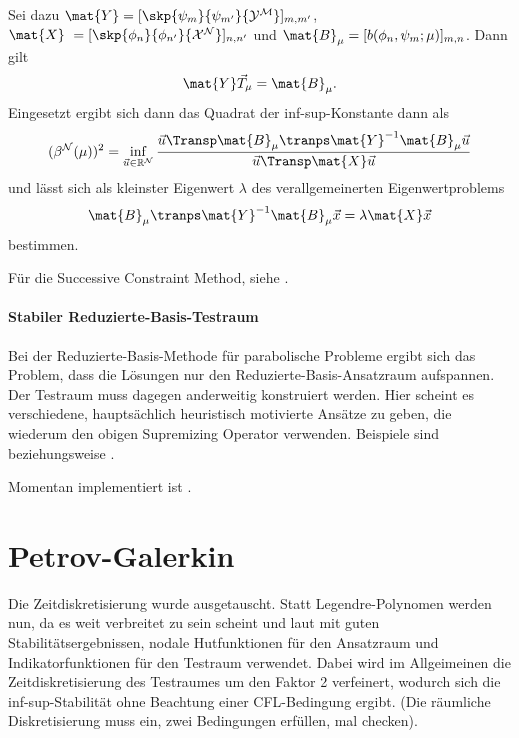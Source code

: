 Sei dazu $\mat{Y} = [\skp{\psi_{m}}{\psi_{m'}}{\mathcal Y^{\mathcal M}}]_{m, m'}$, $\mat{X} = [\skp{\phi_{n}}{\phi_{n'}}{\mathcal X^{\mathcal N}}]_{n, n'}$ und $\mat{B}_{\mu} = [b(\phi_{n}, \psi_{m}; \mu)]_{m, n}$.
Dann gilt
\begin{equation}
    \mat{Y} \vec{T}_{\mu} = \mat{B}_{\mu}.
\end{equation}
Eingesetzt ergibt sich dann das Quadrat der inf-sup-Konstante dann als
\begin{equation}
    (\beta^{\mathcal N}(\mu))^{2} = \inf_{\vec{u} \in \mathbb{R}^{\mathcal N}} \frac{\vec{u}\Transp \mat{B}_{\mu}\tranps \mat{Y}^{-1} \mat{B}_{\mu} \vec{u}}{\vec{u}\Transp \mat{X} \vec{u}}
\end{equation}
und lässt sich als kleinster Eigenwert $\lambda$ des verallgemeinerten Eigenwertproblems
\begin{equation}
    \mat{B}_{\mu}\tranps \mat{Y}^{-1} \mat{B}_{\mu} \vec{x} = \lambda \mat{X} \vec{x}
\end{equation}
bestimmen.

Für die Successive Constraint Method, siehe \textcite{Huynh2007}.



\paragraph{Stabiler Reduzierte-Basis-Testraum} %
\label{par:stabiler_reduzierte_basis_testraum}

Bei der Reduzierte-Basis-Methode für parabolische Probleme ergibt sich das Problem, dass die Lösungen nur den Reduzierte-Basis-Ansatzraum aufspannen. Der Testraum muss dagegen anderweitig konstruiert werden.
Hier scheint es verschiedene, hauptsächlich heuristisch motivierte Ansätze zu geben, die wiederum den obigen Supremizing Operator verwenden.
Beispiele sind \textcite[Abschnitt 4.2]{Mayerhofer:2014vx} beziehungsweise \textcite{Dahmen:2014cl}.

Momentan implementiert ist \textcite[Abschnitt 4.2]{Mayerhofer:2014vx}.


\section{Petrov-Galerkin} %
\label{sec:petrov_galerkin}

Die Zeitdiskretisierung wurde ausgetauscht. Statt Legendre-Polynomen werden nun, da es weit verbreitet zu sein scheint und laut \textcite{Andreev:2012uh,Andreev:2012ep,Andreev:2013gk} mit guten Stabilitätsergebnissen, nodale Hutfunktionen für den Ansatzraum und Indikatorfunktionen für den Testraum verwendet. Dabei wird im Allgeimeinen die Zeitdiskretisierung des Testraumes um den Faktor 2 verfeinert, wodurch sich die inf-sup-Stabilität ohne Beachtung einer CFL-Bedingung ergibt. (Die räumliche Diskretisierung muss ein, zwei Bedingungen erfüllen, mal checken).

